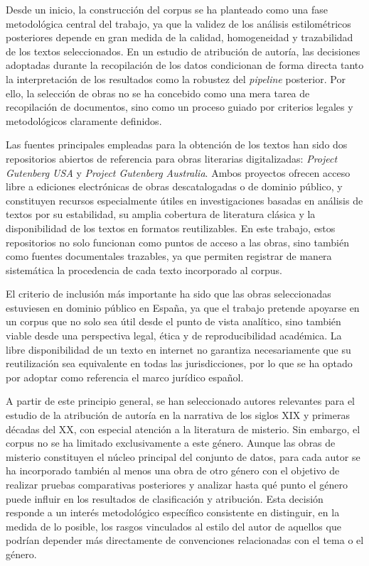 \documentclass[IB]{TFUOC}%
\begin{document}
Desde un inicio, la construcción del corpus se ha planteado como una fase metodológica central del trabajo, ya que la validez de los análisis estilométricos posteriores depende en gran medida de la calidad, homogeneidad y trazabilidad de los textos seleccionados. En un estudio de atribución de autoría, las decisiones adoptadas durante la recopilación de los datos condicionan de forma directa tanto la interpretación de los resultados como la robustez del \textit{pipeline} posterior. Por ello, la selección de obras no se ha concebido como una mera tarea de recopilación de documentos, sino como un proceso guiado por criterios legales y metodológicos claramente definidos.

Las fuentes principales empleadas para la obtención de los textos han sido dos repositorios abiertos de referencia para obras literarias digitalizadas: \textit{Project Gutenberg USA}\cite{projectgutenbergusa} y \textit{Project Gutenberg Australia}\cite{projectgutenbergau}. Ambos proyectos ofrecen acceso libre a ediciones electrónicas de obras descatalogadas o de dominio público, y constituyen recursos especialmente útiles en investigaciones basadas en análisis de textos por su estabilidad, su amplia cobertura de literatura clásica y la disponibilidad de los textos en formatos reutilizables. En este trabajo, estos repositorios no solo funcionan como puntos de acceso a las obras, sino también como fuentes documentales trazables, ya que permiten registrar de manera sistemática la procedencia de cada texto incorporado al corpus.

El criterio de inclusión más importante ha sido que las obras seleccionadas estuviesen en dominio público en España, ya que el trabajo pretende apoyarse en un corpus que no solo sea útil desde el punto de vista analítico, sino también viable desde una perspectiva legal, ética y de reproducibilidad académica. La libre disponibilidad de un texto en internet no garantiza necesariamente que su reutilización sea equivalente en todas las jurisdicciones, por lo que se ha optado por adoptar como referencia el marco jurídico español.

A partir de este principio general, se han seleccionado autores relevantes para el estudio de la atribución de autoría en la narrativa de los siglos XIX y primeras décadas del XX, con especial atención a la literatura de misterio. Sin embargo, el corpus no se ha limitado exclusivamente a este género. Aunque las obras de misterio constituyen el núcleo principal del conjunto de datos, para cada autor se ha incorporado también al menos una obra de otro género con el objetivo de realizar pruebas comparativas posteriores y analizar hasta qué punto el género puede influir en los resultados de clasificación y atribución. Esta decisión responde a un interés metodológico específico consistente en distinguir, en la medida de lo posible, los rasgos vinculados al estilo del autor de aquellos que podrían depender más directamente de convenciones relacionadas con el tema o el género.
\end{document}

